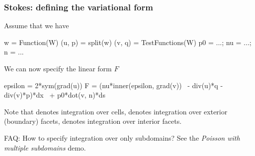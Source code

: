 \begin{frame}[fragile, shrink=5]
  \frametitle{Stokes: defining the variational form}

  Assume that we have
\vspace{-1em}
  \begin{python}
w = Function(W)
(u, p) = split(w)
(v, q) = TestFunctions(W)
p0 = ...; nu = ...; n = ...
  \end{python}

  We can now specify the linear form $F$
  \vspace{-1em}
  \begin{python}
epsilon = 2*sym(grad(u))
F = (nu*inner(epsilon, grad(v)) \
    - div(u)*q - div(v)*p)*dx \
    + p0*dot(v, n)*ds
  \end{python}

\bigskip

Note that  denotes integration over cells,  denotes
integration over exterior (boundary) facets,  denotes
integration over interior facets.

\bigskip

\alert{FAQ:} How to specify integration over only subdomains?
See the \emph{Poisson with multiple subdomains} demo.

\end{frame}
